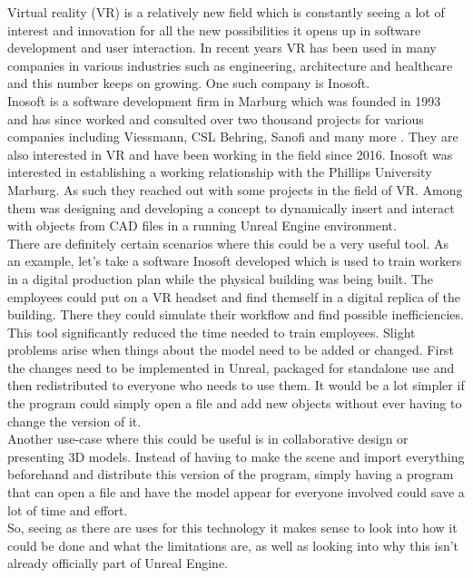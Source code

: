 Virtual reality (\acs{VR}) is a relatively new field which is constantly seeing a lot of interest and innovation for all the new possibilities it opens up in software development and user interaction. In recent years \acs{VR} has been used in many companies in various industries such as engineering, architecture and healthcare and this number keeps on growing\cite{bib:VRFields}. One such company is Inosoft.\\
Inosoft is a software development firm in Marburg which was founded in 1993 and has since worked and consulted over two thousand projects for various companies including Viessmann, CSL Behring, Sanofi and many more \cite{bib:InosoftAbout}. They are also interested in \acs{VR} and have been working in the field since 2016. Inosoft was interested in establishing a working relationship with the Phillips University Marburg. As such they reached out with some projects in the field of \acs{VR}. Among them was designing and developing a concept to dynamically insert and interact with objects from \acs{CAD} files in a running Unreal Engine environment.\\
There are definitely certain scenarios where this could be a very useful tool. As an example, let's take a software Inosoft developed which is used to train workers in a digital production plan while the physical building was being built\cite{bib:InosoftProject}. The employees could put on a VR headset and find themself in a digital replica of the building. There they could simulate their workflow and find possible inefficiencies. This tool significantly reduced the time needed to train employees. Slight problems arise when things about the model need to be added or changed. First the changes need to be implemented in Unreal, packaged for standalone use and then redistributed to everyone who needs to use them. It would be a lot simpler if the program could simply open a file and add new objects without ever having to change the version of it.\\
Another use-case where this could be useful is in collaborative design or presenting 3D models. Instead of having to make the scene and import everything beforehand and distribute this version of the program, simply having a program that can open a file and have the model appear for everyone involved could save a lot of time and effort.\\
So, seeing as there are uses for this technology it makes sense to look into how it could be done and what the limitations are, as well as looking into why this isn't already officially part of Unreal Engine.

